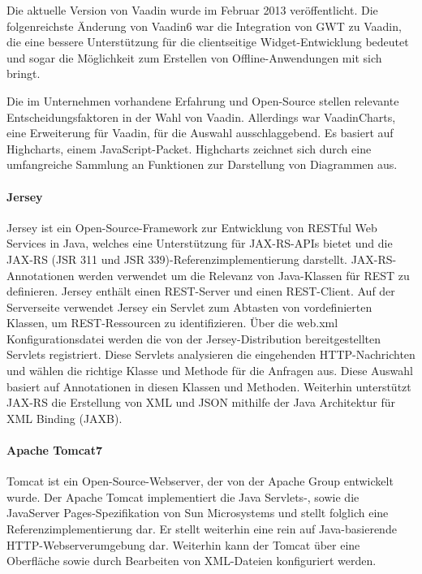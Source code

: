 Die aktuelle Version von Vaadin wurde im Februar 2013 veröffentlicht. Die folgenreichste Änderung von Vaadin6 war die Integration von GWT zu Vaadin, die eine bessere Unterstützung für die clientseitige Widget-Entwicklung bedeutet und sogar die Möglichkeit zum Erstellen von Offline-Anwendungen mit sich bringt.

Die im Unternehmen vorhandene Erfahrung und Open-Source stellen relevante Entscheidungsfaktoren in der Wahl von Vaadin. Allerdings war VaadinCharts, eine Erweiterung für Vaadin, für die Auswahl ausschlaggebend. Es basiert auf Highcharts, einem JavaScript-Packet. Highcharts zeichnet sich durch eine umfangreiche Sammlung an Funktionen zur Darstellung von Diagrammen aus. 

\paragraph{Jersey}

Jersey ist ein Open-Source-Framework zur Entwicklung von RESTful Web Services in Java, welches eine Unterstützung für JAX-RS-APIs bietet und die JAX-RS (JSR 311 und JSR 339)-Referenzimplementierung darstellt. JAX-RS-Annotationen werden verwendet um die Relevanz von Java-Klassen für REST zu definieren. Jersey enthält einen REST-Server und einen REST-Client. Auf der Serverseite verwendet Jersey ein Servlet zum Abtasten von vordefinierten Klassen, um REST-Ressourcen zu identifizieren. Über die web.xml Konfigurationsdatei werden die von der Jersey-Distribution bereitgestellten Servlets registriert. Diese Servlets analysieren die eingehenden HTTP-Nachrichten und wählen die richtige Klasse und Methode für die Anfragen aus. Diese Auswahl basiert auf Annotationen in diesen Klassen und Methoden. Weiterhin unterstützt JAX-RS die Erstellung von XML und JSON mithilfe der Java Architektur für XML Binding (JAXB).

\paragraph{Apache Tomcat7}

Tomcat ist ein Open-Source-Webserver, der von der Apache Group entwickelt wurde. Der Apache Tomcat implementiert die Java Servlets-, sowie die JavaServer Pages-Spezifikation von Sun Microsystems und stellt folglich eine Referenzimplementierung dar. Er stellt weiterhin eine rein auf Java-basierende HTTP-Webserverumgebung dar. Weiterhin kann der Tomcat über eine Oberfläche sowie durch Bearbeiten von XML-Dateien konfiguriert werden.

